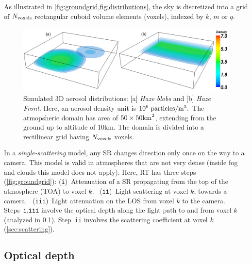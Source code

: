 \documentclass[10pt,letterpaper]{article}
\newcommand{\yoavcomment}[1]{}
\renewcommand{\yoavcomment}[1]{#1} %
\begin{document}
As illustrated in \cref{fig:groundgrid,fig:distributions},
the sky is discretized into a grid of $N_{\rm voxels}$ rectangular cuboid volume elements
(voxels), indexed by $k$, $m$ or $q$.
\begin{figure}
  \centering
  \yoavcomment{\includegraphics[width=\columnwidth]{images/distributions}}
  \caption{\small Simulated 3D aerosol distributions: [a] {\em Haze
      blobs} and [b] {\em Haze Front}.  Here, an aerosol density unit
    is $10^{6}~{\rm particles}/{\rm m}^3.$ The atmopsheric domain has
    area of $50\times 50{\rm km}^2$, extending from the ground up to
    altitude of 10km. The domain is divided into a rectilinear grid
    having $N_{\rm voxels}$ voxels.}
  \label{fig:distributions}
\end{figure}
In a \emph{single-scattering} model, any SR changes direction only
once on the way to a camera. This model is valid in atmospheres that
are not very dense (inside fog and clouds this model does not
apply). Here, RT has three steps (\cref{fig:groundgrid}):
({\tt i})~Attenuation of a SR propagating from the top of the
atmosphere (TOA) to voxel $k$. ~({\tt ii})~Light scattering at voxel
$k$, towards a camera. ~({\tt iii})~Light attenuation on the LOS from
voxel $k$ to the camera.~~ Steps~{\tt i},{\tt iii} involve the optical
depth along the light path to and from voxel $k$ (analyzed in
\cref{sec:optical-depth}).  Step~{\tt ii} involves the scattering
coefficient at voxel $k$ (\cref{sec:scattering}).


\subsection{Optical depth}
\label{sec:optical-depth}
\end{document}
